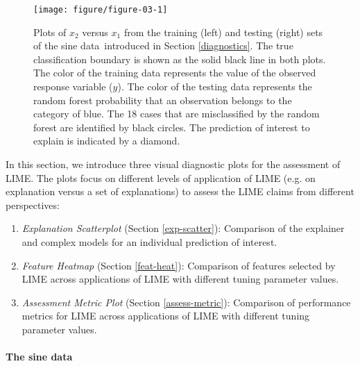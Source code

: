 \documentclass[AMS,STIX2COL]{WileyNJD-v2}\usepackage[]{graphicx}\usepackage[]{color}
\newenvironment{knitrout}{}{} %
\newcommand{\data}{sine data}
\begin{document}
\begin{figure}[!thp]
\centering
\begin{knitrout}
\color{fgcolor}

{\centering \texttt{[image: figure/figure-03-1]} 

}



\end{knitrout}
\caption{Plots of $x_2$ versus $x_1$ from the training (left) and testing (right) sets of the \data \ introduced in Section \ref{diagnostics}. The true classification boundary is shown as the solid black line in both plots. The color of the training data  represents the value of the observed response variable ($y$). The color of the testing data  represents the random forest probability that an observation belongs to the category of blue. The 18 cases that are misclassified by the random forest are identified by black circles. The prediction of interest to explain is indicated by a diamond.}
\label{fig:figure-03}
\end{figure}





In this section, we introduce three visual diagnostic plots for the assessment of LIME. The plots focus on different levels of application of LIME (e.g. on explanation versus a set of explanations) to assess the LIME claims from different perspectives:

\begin{enumerate}
\item \emph{Explanation Scatterplot} (Section \ref{exp-scatter}): Comparison of the explainer and complex models for an individual prediction of interest.
\item \emph{Feature Heatmap} (Section \ref{feat-heat}): Comparison of features selected by LIME across applications of LIME with different tuning parameter values.
\item \emph{Assessment Metric Plot} (Section \ref{assess-metric}): Comparison of performance metrics for LIME across applications of LIME with different tuning parameter values. 
\end{enumerate}

\paragraph{The \data}
\end{document}
